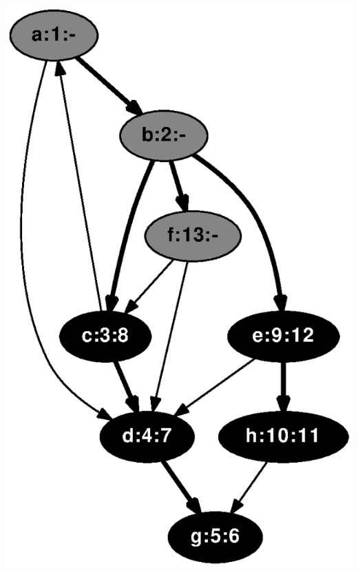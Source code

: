 \documentclass{article}
\begin{document}
\includegraphics[height=.3\textheight]{dfs_directed_classroom_13.eps}
\vspace{1em}
\end{document}
